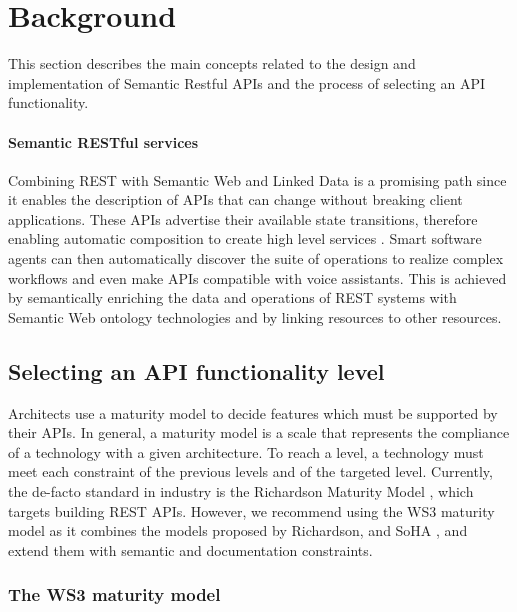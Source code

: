 \section{Background} \label{sec:background}

\vspace*{-0.2cm}


This section describes the main concepts related to the design and implementation of Semantic Restful APIs and the process of selecting an API functionality.

\paragraph{Semantic RESTful services}
Combining REST with Semantic Web and Linked Data is a promising path since it enables the description of APIs that can change without breaking client applications. These APIs advertise their available state transitions, therefore enabling automatic composition to create high level services \cite{alarcon2015rest}. Smart software agents can then automatically discover the suite of operations to realize complex workflows and even make APIs compatible with voice assistants. This is achieved by semantically enriching the data and operations of REST systems with Semantic Web ontology technologies and by linking resources to other resources.

\subsection{Selecting an API functionality level}\label{sec:maturityLevel}

Architects use a maturity model to decide features which must be supported by their APIs. In general, a maturity model is a scale that represents the compliance of a technology with a given architecture. To reach a level, a technology must meet each constraint of the previous levels and of the targeted level.
Currently, the de-facto standard in industry is the Richardson Maturity Model \cite{RichardsonMaturityModel}, which targets building REST APIs. However, we recommend using the WS3 maturity model \cite{7195633} as it combines the models proposed by Richardson, and SoHA \cite{SoHA}, and extend them with semantic and documentation constraints.

\subsubsection{The WS3 maturity model}

